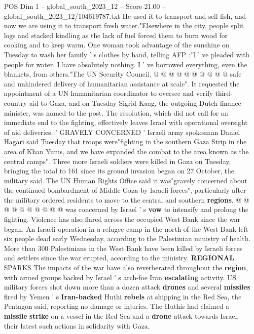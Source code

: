 \begin{textsample}{POS Dim 1 – global\_south\_2023\_12 – Score 21.00 – global\_south\_2023\_12/104619787.txt}
He used it to transport and sell fish, and now we are using it to transport fresh water."Elsewhere in the city, people split logs and stacked kindling as the lack of fuel forced them to burn wood for cooking and to keep warm.
One woman took advantage of the sunshine on Tuesday to wash her family ' s clothes by hand, telling AFP :"I ' ve pleaded with people for water.
I have absolutely nothing.
I ' ve borrowed everything, even the blankets, from others."The UN Security Council, @ @ @ @ @ @ @ @ @ @ safe and unhindered delivery of humanitarian assistance at scale".
It requested the appointment of a UN humanitarian coordinator to oversee and verify third-country aid to Gaza, and on Tuesday Sigrid Kaag, the outgoing Dutch finance minister, was named to the post.
The resolution, which did not call for an immediate end to the fighting, effectively leaves Israel with operational oversight of aid deliveries. ' GRAVELY CONCERNED ' Israeli army spokesman Daniel Hagari said Tuesday that troops were"fighting in the southern Gaza Strip in the area of Khan Yunis, and we have expanded the combat to the area known as the central camps".
Three more Israeli soldiers were killed in Gaza on Tuesday, bringing the total to 161 since its ground invasion began on 27 October, the military said.
The UN Human Rights Office said it was"gravely concerned about the continued bombardment of Middle Gaza by Israeli forces", particularly after the military ordered residents to move to the central and southern \textbf{regions}. @ @ @ @ @ @ @ @ @ @ was concerned by Israel ' s \textbf{vow} to intensify and prolong the fighting.
Violence has also flared across the occupied West Bank since the war began.
An Israeli operation in a refugee camp in the north of the West Bank left six people dead early Wednesday, according to the Palestinian ministry of health.
More than 300 Palestinians in the West Bank have been killed by Israeli forces and settlers since the war erupted, according to the ministry. \textbf{REGIONAL} SPARKS The impacts of the war have also reverberated throughout the \textbf{region}, with armed groups backed by Israel ' s arch-foe Iran \textbf{escalating} activity.
US military forces shot down more than a dozen attack \textbf{drones} and several \textbf{missiles} fired by Yemen ' s \textbf{Iran-backed} Huthi \textbf{rebels} at shipping in the Red Sea, the Pentagon said, reporting no damage or injuries.
The Huthis had claimed a \textbf{missile} \textbf{strike} on a vessel in the Red Sea and a \textbf{drone} attack towards Israel, their latest such actions in solidarity with Gaza.

\end{textsample}

